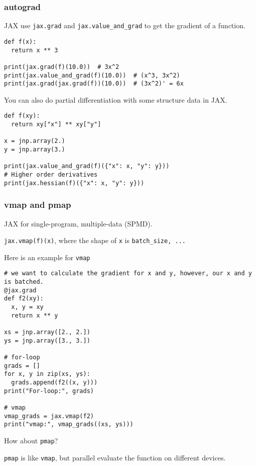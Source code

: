 \documentclass[11pt]{article}
\begin{document}
\subsubsection{autograd}
\label{sec:orgc32fa7d}

JAX use \texttt{jax.grad} and \texttt{jax.value\_and\_grad} to get the gradient of a function.

\begin{verbatim}
def f(x):
  return x ** 3

print(jax.grad(f)(10.0))  # 3x^2
print(jax.value_and_grad(f)(10.0))  # (x^3, 3x^2)
print(jax.grad(jax.grad(f))(10.0))  # (3x^2)' = 6x
\end{verbatim}

You can also do partial differentiation with some structure data in JAX.

\begin{verbatim}
def f(xy):
  return xy["x"] ** xy["y"]

x = jnp.array(2.)
y = jnp.array(3.)

print(jax.value_and_grad(f)({"x": x, "y": y}))
# Higher order derivatives
print(jax.hessian(f)({"x": x, "y": y}))
\end{verbatim}
\subsubsection{vmap and pmap}
\label{sec:org2791a97}

JAX for single-program, multiple-data (SPMD).

\texttt{jax.vmap(f)(x)}, where the shape of \texttt{x} is \texttt{batch\_size, ...}

Here is an example for \texttt{vmap}

\begin{verbatim}
# we want to calculate the gradient for x and y, however, our x and y is batched.
@jax.grad
def f2(xy):
  x, y = xy
  return x ** y

xs = jnp.array([2., 2.])
ys = jnp.array([3., 3.])

# for-loop
grads = []
for x, y in zip(xs, ys):
  grads.append(f2((x, y)))
print("For-loop:", grads)

# vmap
vmap_grads = jax.vmap(f2)
print("vmap:", vmap_grads((xs, ys)))
\end{verbatim}

How about \texttt{pmap}?

\texttt{pmap} is like \texttt{vmap}, but parallel evaluate the function on different devices.
\end{document}
